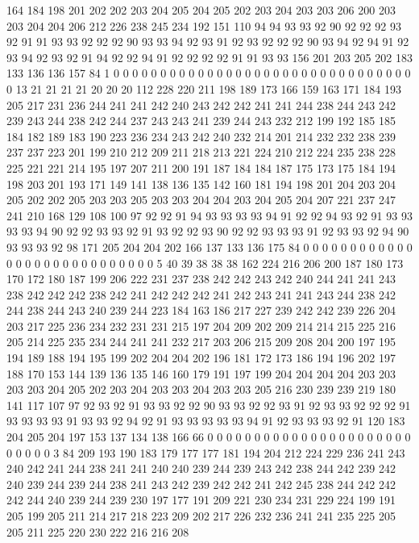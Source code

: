 164 184 198 201 202 202 203 204 205 204 205 202 203 204 203 203 206 200 203 203
204 204 206 212 226 238 245 234 192 151 110 94 94 93 93 92 90 92 92 92
93 92 91 91 93 93 92 92 92 90 93 93 94 92 93 91 92 93 92 92
92 90 93 94 92 94 91 92 93 94 92 93 92 91 94 92 92 94 91 92
92 92 92 91 91 93 93 156 201 203 205 202 183 133 136 136 157 84 1 0
0 0 0 0 0 0 0 0 0 0 0 0 0 0 0 0 0 0 0 0
0 0 0 0 0 0 0 0 0 0 0 0 13 21 21 21 21 20 20 20
112 228 220 211 198 189 173 166 159 163 171 184 193 205 217 231 236 244 241 241
242 240 243 242 242 241 241 244 238 244 243 242 239 243 244 238 242 244 237 243
243 241 239 244 243 232 212 199 192 185 185 184 182 189 183 190 223 236 234 243
242 240 232 214 201 214 232 232 238 239 237 237 223 201 199 210 212 209 211 218
213 221 224 210 212 224 235 238 228 225 221 221 214 195 197 207 211 200 191 187
184 184 187 175 173 175 184 194 198 203 201 193 171 149 141 138 136 135 142 160
181 194 198 201 204 203 204 205 202 202 205 203 203 205 203 203 204 204 203 204
205 204 207 221 237 247 241 210 168 129 108 100 97 92 92 91 94 93 93 93
93 94 91 92 92 94 93 92 91 93 93 93 93 94 90 92 92 93 93 92
91 93 92 92 93 90 92 92 93 93 93 91 92 93 93 92 94 90 93 93
93 92 98 171 205 204 204 202 166 137 133 136 175 84 0 0 0 0 0 0
0 0 0 0 0 0 0 0 0 0 0 0 0 0 0 0 0 0 0 0
0 0 5 40 39 38 38 38 162 224 216 206 200 187 180 173 170 172 180 187
199 206 222 231 237 238 242 242 243 242 240 244 241 241 243 238 242 242 242 238
242 241 242 242 242 241 242 243 241 241 243 244 238 242 244 238 244 243 240 239
244 223 184 163 186 217 227 239 242 242 239 226 204 203 217 225 236 234 232 231
231 215 197 204 209 202 209 214 214 215 225 216 205 214 225 235 234 244 241 241
232 217 203 206 215 209 208 204 200 197 195 194 189 188 194 195 199 202 204 204
202 196 181 172 173 186 194 196 202 197 188 170 153 144 139 136 135 146 160 179
191 197 199 204 204 204 204 203 203 203 203 204 205 202 203 204 203 203 204 203
203 205 216 230 239 239 219 180 141 117 107 97 92 93 92 91 93 93 92 92
90 93 93 92 92 93 91 92 93 93 92 92 92 91 93 93 93 93 91 93
93 92 94 92 91 93 93 93 93 93 94 91 92 93 93 93 92 91 120 183
204 205 204 197 153 137 134 138 166 66 0 0 0 0 0 0 0 0 0 0
0 0 0 0 0 0 0 0 0 0 0 0 0 0 0 0 0 3 84 209
193 190 183 179 177 177 181 194 204 212 224 229 236 241 243 240 242 241 244 238
241 241 240 240 239 244 239 243 242 238 244 242 239 242 240 239 244 239 244 238
241 243 242 239 242 242 241 242 245 238 244 242 242 242 244 240 239 244 239 230
197 177 191 209 221 230 234 231 229 224 199 191 205 199 205 211 214 217 218 223
209 202 217 226 232 236 241 241 235 225 205 205 211 225 220 230 222 216 216 208
